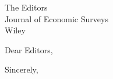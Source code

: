 \documentclass[11pt,a4paper]{letter}
\begin{document}
\begin{letter}{The Editors \\ Journal of Economic Surveys \\ Wiley}

\opening{Dear Editors,}


\closing{Sincerely,}

\end{letter}
\end{document}
